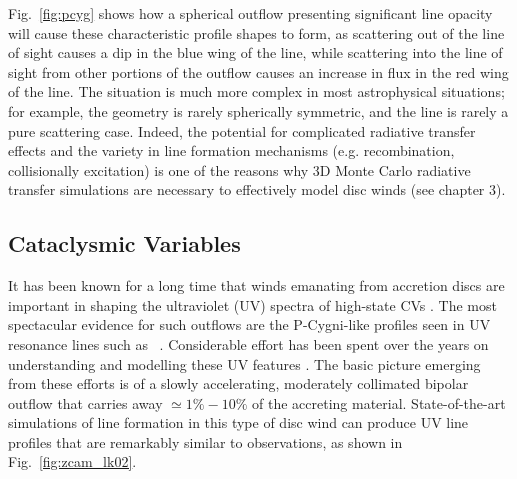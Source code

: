 Fig.~\ref{fig:pcyg} shows how a spherical outflow presenting
significant line opacity will 
cause these characteristic profile shapes to form, 
as scattering out of the line of sight 
causes a dip in the blue wing of the line, while scattering into the 
line of sight from other portions of the outflow causes an increase in flux
in the red wing of the line. The situation is much more complex in most
astrophysical situations; for example, the geometry is rarely spherically 
symmetric, and the line is rarely a pure scattering case. 
Indeed, the potential 
for complicated radiative transfer effects and 
the variety in line formation mechanisms 
(e.g. recombination, collisionally excitation)
is one of the reasons why 3D Monte Carlo radiative 
transfer simulations are necessary
to effectively model disc winds (see chapter 3).



\subsection{Cataclysmic Variables}
\label{sec:cv_winds}
It has been known for a long time that winds emanating from
accretion discs are important in shaping the ultraviolet (UV) spectra
of high-state CVs \citep{heap1978, greensteinoke1982}. 
The most spectacular evidence for such
outflows are the P-Cygni-like profiles seen in UV resonance lines such as
\civfull\ \citep[e.g. ][see Fig.~\ref{fig:cordova}]{cordova1982}. 
Considerable effort has been spent over the
years on understanding and modelling these UV features 
\citep[e.g.][]{drewverbunt1985,maucheraymond1987,SV93,KWD95,
kd1997,knigge1997,LK02,noebauer,puebla2011}. 
The basic picture emerging from these efforts is
of a slowly accelerating, moderately collimated bipolar
outflow that carries away $\simeq 1\% - 10\%$ of the accreting
material. State-of-the-art simulations of line formation in this type
of disc wind can produce UV line profiles that are remarkably similar
to observations, as shown in Fig.~\ref{fig:zcam_lk02}.

